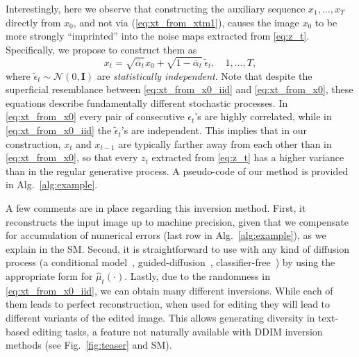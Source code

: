 

Interestingly, here we observe that constructing the auxiliary sequence $x_1,\ldots,x_T$ directly from $x_0$, and not via  (\ref{eq:xt_from_xtm1}), causes the image $x_0$ to be more strongly ``imprinted'' into the noise maps extracted from \eqref{eq:z_t}. 
Specifically, we propose to construct them as
\begin{equation}
\label{eq:xt_from_x0_iid}
x_t = \sqrt{\bar\alpha_t} x_0 + \sqrt{1-\bar\alpha_t}\, \tilde{\epsilon}_t,\quad 1,\ldots,T,
\end{equation}
where $\tilde{\epsilon}_t\sim\mathcal{N}(0,\boldsymbol{I})$ are \emph{statistically independent}. Note that despite the superficial resemblance between \eqref{eq:xt_from_x0_iid} and \eqref{eq:xt_from_x0}, these equations describe fundamentally different stochastic processes. In \eqref{eq:xt_from_x0} every pair of consecutive $\epsilon_t$'s are highly correlated, while in \eqref{eq:xt_from_x0_iid} the $\tilde{\epsilon}_t$'s are independent. This implies that in our construction, $x_t$ and $x_{t-1}$ are typically farther away from each other than in \eqref{eq:xt_from_x0}, so that every $z_t$ extracted from \eqref{eq:z_t} has a higher variance than in the regular generative process. A pseudo-code of our method is provided in Alg.~\ref{alg:example}. 


A few comments are in place regarding this inversion method. First, it reconstructs the input image up to machine precision, given that we compensate for accumulation of numerical errors (last row in Alg.~\ref{alg:example}), as we explain in the SM. Second, it is straightforward to use with any kind of diffusion process (\eg a conditional model~\cite{Ho2021Cascaded,Ho20,Rombach22}, guided-diffusion~\cite{Prafulla21},
classifier-free~\cite{Ho21}) by using the appropriate form for $\hat\mu_t(\cdot)$. Lastly, due to the randomness in \eqref{eq:xt_from_x0_iid}, we can obtain many different inversions. While each of them leads to perfect reconstruction, when used for editing they will lead to different variants of the edited image. This allows generating diversity in \eg text-based editing tasks, a feature not naturally available with DDIM inversion methods (see Fig.~\ref{fig:teaser} and SM).%


